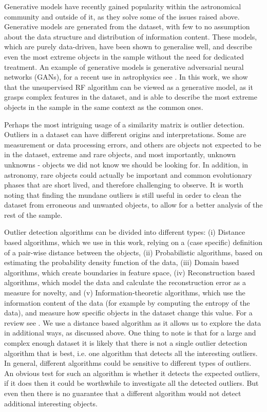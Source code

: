 \documentclass[fleqn,usenatbib]{mnras}
\begin{document}
Generative models have recently gained popularity within the astronomical community and outside of it, as they solve some of the issues raised above. Generative models are generated from the dataset, with few to no assumption about the data structure and distribution of information content. These models, which are purely data-driven, have been shown to generalise well, and describe even the most extreme objects in the sample without the need for dedicated treatment. An example of generative models is generative adversarial neural networks (GANs), for a recent use in astrophysics see \citet{schawinski17}. In this work, we show that the unsupervised RF algorithm can be viewed as a generative model, as it grasps complex features in the dataset, and is able to describe the most extreme objects in the sample in the same context as the common ones.

Perhaps the most intriguing usage of a similarity matrix is outlier detection. Outliers in a dataset can have different origins and interpretations. Some are measurement or data processing errors, and others are objects not expected to be in the dataset, extreme and rare objects, and most importantly, unknown unknowns - objects we did not know we should be looking for. In addition, in astronomy, rare objects could actually be important and common evolutionary phases that are short lived, and therefore challenging to observe.  It is worth noting that finding the mundane outliers is still useful in order to clean the dataset from erroneous and unwanted objects, to allow for a better analysis of the rest of the sample.  

Outlier detection algorithms can be divided into different types: (i) Distance based algorithms, which we use in this work, relying on a (case specific) definition of a pair-wise distance between the objects, (ii) Probabilistic algorithms, based on estimating the probability density function of the data, (iii) Domain based algorithms, which create boundaries in feature space, (iv) Reconstruction based algorithms, which model the data and calculate the reconstruction error as a measure for novelty, and (v) Information-theoretic algorithms, which use the information content of the data (for example by computing the entropy of the data), and measure how specific objects in the dataset change this value. For a review see \citet{pimentel14}. We use a distance based algorithm as it allows us to explore the data in additional ways, as discussed above. One thing to note is that for a large and complex enough dataset it is likely that there is not a single outlier detection algorithm that is best, i.e. one algorithm that detects all the interesting outliers. In general, different algorithms could be sensitive to different types of outliers. An obvious test for such an algorithm is whether it detects the expected outliers, if it does then it could be worthwhile to investigate all the detected outliers. But even then there is no guarantee that a different algorithm would not detect additional interesting objects.
\end{document}
